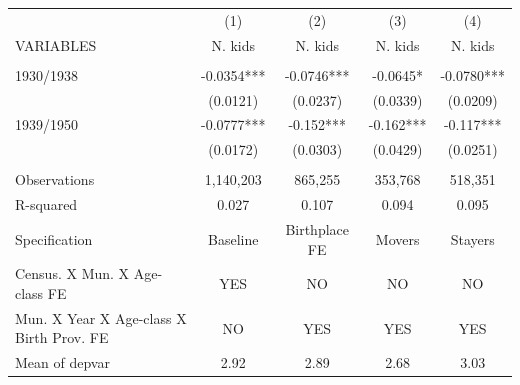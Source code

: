 \begin{tabular}{lcccc} \hline
 & (1) & (2) & (3) & (4) \\
VARIABLES & N. kids & N. kids & N. kids & N. kids \\ \hline
 &  &  &  &  \\
1930/1938 & -0.0354*** & -0.0746*** & -0.0645* & -0.0780*** \\
 & (0.0121) & (0.0237) & (0.0339) & (0.0209) \\
1939/1950 & -0.0777*** & -0.152*** & -0.162*** & -0.117*** \\
 & (0.0172) & (0.0303) & (0.0429) & (0.0251) \\
 &  &  &  &  \\
Observations & 1,140,203 & 865,255 & 353,768 & 518,351 \\
R-squared & 0.027 & 0.107 & 0.094 & 0.095 \\
Specification & Baseline & Birthplace FE & Movers & Stayers \\
Census. X Mun. X Age-class FE & YES & NO & NO & NO \\
Mun. X Year X Age-class X Birth Prov. FE & NO & YES & YES & YES \\
Mean of depvar & 2.92 & 2.89 & 2.68 & 3.03 \\ \hline
\end{tabular}
